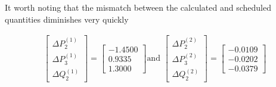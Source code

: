 \documentclass[11pt, oneside, reqno]{amsart}
\numberwithin{equation}{section}
\theoremstyle{plain}%
\theoremstyle{definition}
\theoremstyle{remark}
\begin{document}
It worth noting that the mismatch between the calculated and scheduled quantities diminishes very quickly


\begin{align*}
\begin{bmatrix}
	\Delta P^{(1)}_2 \\
	\Delta P^{(1)}_3\\
	\Delta Q^{(1)}_2
\end{bmatrix}
=
\begin{bmatrix}
	-1.4500\\
	0.9335\\
	1.3000
\end{bmatrix}
\text{and }
\begin{bmatrix}
	\Delta P^{(2)}_2 \\
	\Delta P^{(2)}_3\\
	\Delta Q^{(2)}_2
\end{bmatrix}
=
\begin{bmatrix}
	-0.0109\\
	-0.0202\\
	-0.0379
\end{bmatrix}
\end{align*}
\end{document}
